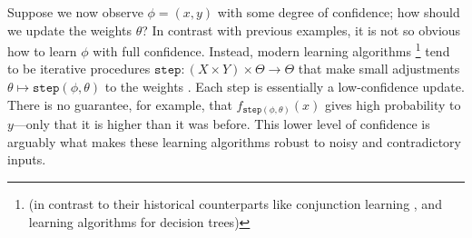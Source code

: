 \begin{example}
Suppose we now observe $\phi = (x,y)$
with some degree of confidence;
how should we update the weights $\theta$?
%
\def\step{\mathtt{step}}
In contrast with previous examples, it is not so obvious
		how to learn
		 $\phi$ with full confidence.
Instead, modern learning algorithms
\unskip\footnote{(in contrast to their historical counterparts
		like conjunction learning \cite{conj_learning},
        and learning algorithms for decision trees)}
tend to be 
iterative
procedures
$\step: (X \times Y) \times \Theta \to \Theta$
that make small adjustments 
$\theta \mapsto \step(\phi,\theta)$
to the weights
\unskip. 
Each step is essentially a low-confidence update.
%
There is no guarantee, for example, that 
	$f_{\step(\phi,\theta)}(x)$ 
gives high probability to $y$---only that it is higher than it was before.
This lower level of confidence is arguably what makes these learning algorithms robust to noisy and contradictory inputs. 
\end{example}
